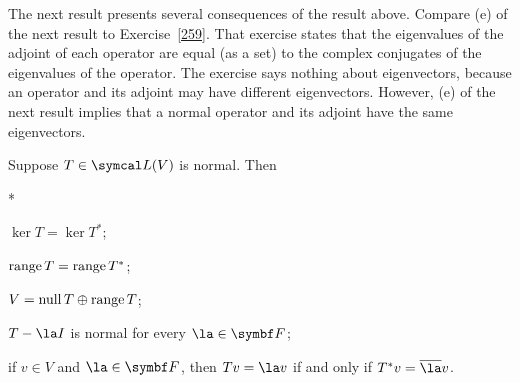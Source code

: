 The next result presents several consequences of the result above. Compare (e) of the next result to  Exercise~\ref{259}.  That
exercise states that the eigenvalues of the adjoint of each operator are equal (as
a set) to the complex conjugates of the eigenvalues of the operator.  The
exercise says nothing about eigenvectors, because an operator and its adjoint
may have different eigenvectors.  However, (e) of the next result implies that a
normal operator and its adjoint have the same eigenvectors.

{Suppose $T \in \L(V)$ is normal. Then
\begin{subtheorem}*
\item
$\ker T = \ker T^*$;
\item
$\operatorname{range} T = \operatorname{range} T^*$;
\item
$V = \operatorname{null} T \oplus \operatorname{range} T$;
\item
$T - \la I$ is normal for every $\la \in \F{}$;
\item
if $v \in V$ and $\la \in \F{}$, then $Tv = \la v$ if and only if $T^*v = \bar{\la} v$.
\end{subtheorem}}

